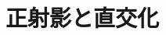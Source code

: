 \documentclass[../../topic_linear-algebra]{subfiles}
\begin{document}
\chapter{正射影と直交化}



\end{document}
